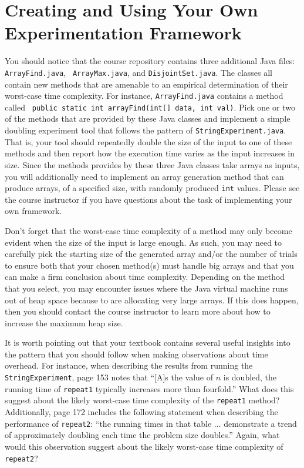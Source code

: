 \section*{Creating and Using Your Own Experimentation Framework}

You should notice that the course repository contains three additional Java files: {\tt ArrayFind.java}, {\tt
ArrayMax.java}, and {\tt DisjointSet.java}. The classes all contain new methods that are amenable to an empirical
determination of their worst-case time complexity. For instance, {\tt ArrayFind.java} contains a method called {\tt
public static int arrayFind(int[] data, int val)}.  Pick one or two of the methods that are provided by these Java
classes and implement a simple doubling experiment tool that follows the pattern of {\tt StringExperiment.java}. That
is, your tool should repeatedly double the size of the input to one of these methods and then report how the execution
time varies as the input increases in size. Since the methods provides by these three Java classes take arrays as
inputs, you will additionally need to implement an array generation method that can produce arrays, of a specified size,
with randomly produced {\tt int} values.  Please see the course instructor if you have questions about the task of
implementing your own framework.

Don't forget that the worst-case time complexity of a method may only become evident when the size of the input is large
enough. As such, you may need to carefully pick the starting size of the generated array and/or the number of trials to
ensure both that your chosen method(s) must handle big arrays and that you can make a firm conclusion about time
complexity.  Depending on the method that you select, you may encounter issues where the Java virtual machine runs out of
heap space because to are allocating very large arrays. If this does happen, then you should contact the course
instructor to learn more about how to increase the maximum heap size.

It is worth pointing out that your textbook contains several useful insights into the pattern that you should follow
when making observations about time overhead. For instance, when describing the results from running the {\tt
StringExperiment}, page 153 notes that ``[A]s the value of $n$ is doubled, the running time of {\tt repeat1} typically
increases more than fourfold.'' What does this suggest about the likely worst-case time complexity of the {\tt repeat1}
method? Additionally, page 172 includes the following statement when describing the performance of {\tt repeat2}: ``the
running times in that table $\ldots$ demonstrate a trend of approximately doubling each time the problem size doubles.''
Again, what would this observation suggest about the likely worst-case time complexity of {\tt repeat2}? 

